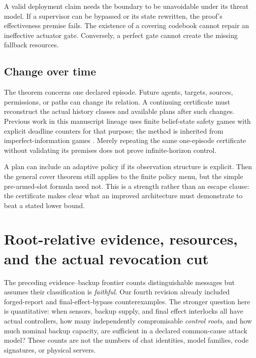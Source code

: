 \documentclass[11pt,a4paper]{article}
\theoremstyle{definition}\newtheorem{definition}{Definition}
\begin{document}
A valid deployment claim needs the boundary to be unavoidable under its threat model. If a supervisor can be bypassed or its state rewritten, the proof's effectiveness premise fails. The existence of a covering codebook cannot repair an ineffective actuator gate. Conversely, a perfect gate cannot create the missing fallback resources.

\subsection{Change over time}
The theorem concerns one declared episode. Future agents, targets, sources, permissions, or paths can change its relation. A continuing certificate must reconstruct the actual history classes and available plans after such changes. Previous work in this manuscript lineage uses finite belief-state safety games with explicit deadline counters for that purpose; the method is inherited from imperfect-information games \cite{chatterjee}. Merely repeating the same one-episode certificate without validating its premises does not prove infinite-horizon control.

A plan can include an adaptive policy if its observation structure is explicit. Then the general cover theorem still applies to the finite policy menu, but the simple pre-armed-slot formula need not. This is a strength rather than an escape clause: the certificate makes clear what an improved architecture must demonstrate to beat a stated lower bound.

\section{Root-relative evidence, resources, and the actual revocation cut}
\label{sec:roots}
The preceding evidence--backup frontier counts distinguishable messages but assumes their classification is \emph{faithful}. Our fourth revision already included forged-report and final-effect-bypass counterexamples. The stronger question here is quantitative: when sensors, backup supply, and final effect interlocks all have actual controllers, how many independently compromisable \emph{control roots}, and how much nominal backup capacity, are sufficient in a declared common-cause attack model? These counts are not the numbers of chat identities, model families, code signatures, or physical servers.
\end{document}
